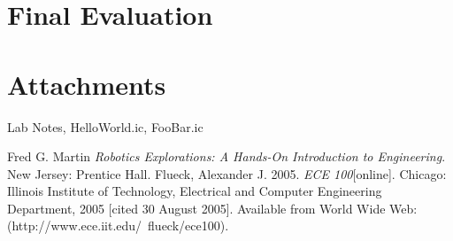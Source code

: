 \documentclass[a4paper, 11pt]{article}
\begin{document}
\section*{Final Evaluation}
\lipsum[7]

\section*{Attachments}
Lab Notes, HelloWorld.ic, FooBar.ic

\begin{thebibliography}{9}
 Fred G. Martin \emph{Robotics Explorations: A Hands-On
Introduction to Engineering}. New Jersey: Prentice Hall.
  Flueck, Alexander J. 2005. \emph{ECE 100}[online]. Chicago:
Illinois Institute of Technology, Electrical and Computer Engineering
Department, 2005 [cited 30
August 2005]. Available from World Wide Web:
(http://www.ece.iit.edu/~flueck/ece100).
\end{thebibliography}
\end{document}
